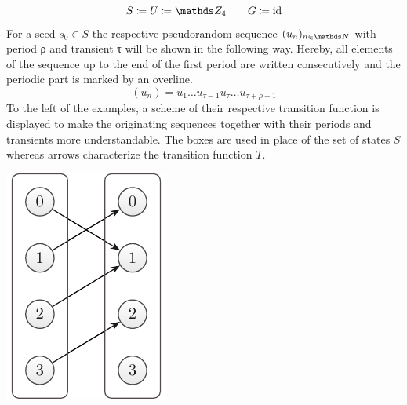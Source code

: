 \documentclass{stdlocal}
\begin{document}
  \[
    S \define U \define \setInteger_4
    \separate
    G \define \identity
  \]
  For a seed $s_0 \in S$ the respective pseudorandom sequence $(u_n)_{n\in\setNatural}$ with period ρ and transient τ will be shown in the following way.
  Hereby, all elements of the sequence up to the end of the first period are written consecutively and the periodic part is marked by an overline.
  \[
    (u_n) = u_1\ldots u_{τ-1} \overline{u_τ\ldots u_{τ+ρ-1}}
  \]
  To the left of the examples, a scheme of their respective transition function is displayed to make the originating sequences together with their periods and transients more understandable.
  The boxes are used in place of the set of states $S$ whereas arrows characterize the transition function $T$.

  \medskip
  \begin{minipage}{0.2\textwidth}
    \includegraphics[width=\textwidth]{figures/periodicity_example_a.pdf}
  \end{minipage}
\end{document}
